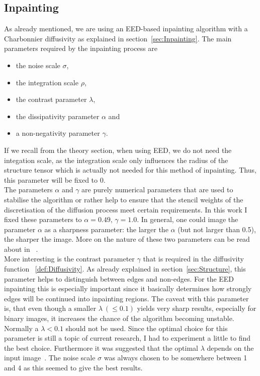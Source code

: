 \subsection{Inpainting}\label{sec:InpaintingEx}
As already mentioned, we are using an EED-based inpainting algorithm with a Charbonnier diffusivity
as explained in section~\ref{sec:Inpainting}.
The main parameters required by the inpainting process are 
\begin{itemize}
    \item the noise scale $\sigma$,
    \item the integration scale $\rho$,
    \item the contrast parameter $\lambda$, 
    \item the dissipativity parameter $\alpha$ and
    \item a non-negativity parameter $\gamma$.
\end{itemize}
If we recall from the theory section, when using EED, we do not need the integation scale, as the
integration scale only influences the radius of the structure tensor which is actually not needed
for this method of inpainting. Thus, this parameter will be fixed to 0.\\
The parameters $\alpha$ and $\gamma$ are purely numerical parameters that are used to 
stabilise the algorithm or rather help to ensure that the stencil weights of the discretisation of
the diffusion process meet certain requirements.
In this work I fixed these parameters to $\alpha=0.49,\, \gamma=1.0$\cite{conversation}. In general, one could image the parameter $\alpha$ as a sharpness parameter: the larger the
$\alpha$ (but not larger than 0.5), the sharper the image. More on the nature of these two parameters can be read about in
~\cite{www13, weickert96}.\\
More interesting is the contrast parameter $\gamma$ that is required in the diffusivity function
~\eqref{def:Diffusivity}. As already explained in section~\ref{sec:Structure}, this parameter helps to
distinguish between edges and non-edges. For the EED inpainting this is especially important since
it basically determines how strongly edges will be continued into inpainting regions. 
The caveat with this parameter is, that even though a smaller $\lambda\ (\leq0.1)$ yields very sharp
results, especially for binary images, it increases the chance of the algorithm becoming unstable.
Normally a $\lambda<0.1$ should not be used\cite{conversation}. Since the optimal choice for this parameter is still a
topic of current research, I had to experiment a little to find the best choice. Furthermore it was
suggested that the optimal $\lambda$ depends on the input image~\cite{schmaltz14}. 
The noise scale $\sigma$ was always chosen to be somewhere between 1 and 4 as this seemed to give
the best results.
